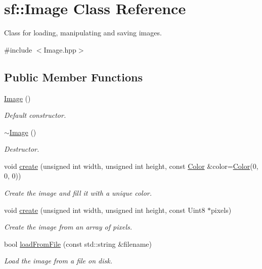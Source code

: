 \hypertarget{classsf_1_1_image}{}\section{sf\+:\+:Image Class Reference}
\label{classsf_1_1_image}


Class for loading, manipulating and saving images.  




{\ttfamily \#include $<$Image.\+hpp$>$}

\subsection*{Public Member Functions}
\begin{DoxyCompactItemize}
\item 
\mbox{\hyperlink{classsf_1_1_image_abb4caf3cb167b613345ebe36fc883f12}{Image}} ()
\begin{DoxyCompactList}\small\item\em Default constructor. \end{DoxyCompactList}\item 
\mbox{\hyperlink{classsf_1_1_image_a0ba22a38e6c96e3b37dd88198046de83}{$\sim$\+Image}} ()
\begin{DoxyCompactList}\small\item\em Destructor. \end{DoxyCompactList}\item 
void \mbox{\hyperlink{classsf_1_1_image_a2a67930e2fd9ad97cf004e918cf5832b}{create}} (unsigned int width, unsigned int height, const \mbox{\hyperlink{classsf_1_1_color}{Color}} \&color=\mbox{\hyperlink{classsf_1_1_color}{Color}}(0, 0, 0))
\begin{DoxyCompactList}\small\item\em Create the image and fill it with a unique color. \end{DoxyCompactList}\item 
void \mbox{\hyperlink{classsf_1_1_image_a1c2b960ea12bdbb29e80934ce5268ebf}{create}} (unsigned int width, unsigned int height, const Uint8 $\ast$pixels)
\begin{DoxyCompactList}\small\item\em Create the image from an array of pixels. \end{DoxyCompactList}\item 
bool \mbox{\hyperlink{classsf_1_1_image_a9e4f2aa8e36d0cabde5ed5a4ef80290b}{load\+From\+File}} (const std\+::string \&filename)
\begin{DoxyCompactList}\small\item\em Load the image from a file on disk. \end{DoxyCompactList}\item 

\end{DoxyCompactItemize}
